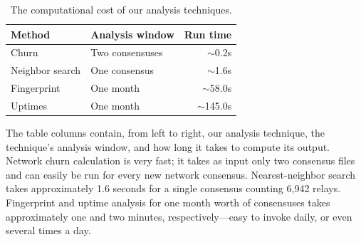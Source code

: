 \begin{table}[t]
	\centering
	\begin{tabular}{l l r}
	\toprule
	\textbf{Method} & \textbf{Analysis window} & \textbf{Run time} \\
	\midrule
	Churn & Two consensuses & $\sim$0.2s \\
	Neighbor search & One consensus & $\sim$1.6s \\
	Fingerprint & One month & $\sim$58.0s \\
	Uptimes & One month & $\sim$145.0s \\
	\bottomrule
	\end{tabular}
	\caption{The computational cost of our analysis techniques.}
	\label{tab:exp-deployment}
\end{table}

The table columns contain, from left to right, our analysis technique, the
technique's analysis window, and how long it takes to compute its output.
Network churn calculation is very fast; it takes as input only two consensus
files and can easily be run for every new network consensus.  Nearest-neighbor
search takes approximately 1.6 seconds for a single consensus counting 6,942
relays.  Fingerprint and uptime analysis for one month worth of consensuses
takes approximately one and two minutes, respectively---easy to invoke daily, or
even several times a day.
